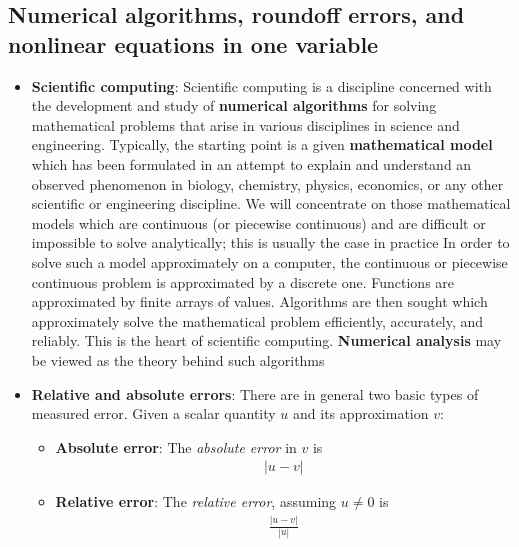 \documentclass{report}
\begin{document}
    \subsection{Numerical algorithms, roundoff errors, and nonlinear equations in one variable}
    \begin{itemize}
        \item \textbf{Scientific computing}: Scientific computing is a discipline concerned with the development and study of \textbf{numerical algorithms} for solving mathematical problems that arise in various disciplines in science and engineering.
            \bigbreak \noindent 
            Typically, the starting point is a given \textbf{mathematical model} which has been formulated in an attempt to explain and understand an observed phenomenon in biology, chemistry, physics, economics, or any other scientific or engineering discipline. We will concentrate on those mathematical models which are continuous (or piecewise continuous) and are difficult or impossible to solve analytically; this is usually the case in practice
            \bigbreak \noindent 
            In order to solve such a model approximately on a computer, the continuous or piecewise continuous problem is approximated by a discrete one. Functions are approximated by finite arrays of values. Algorithms are then sought which approximately solve the mathematical problem efficiently, accurately, and reliably. This is the heart of scientific computing. \textbf{Numerical analysis} may be viewed as the theory behind such algorithms
            \bigbreak \noindent 
        \item \textbf{Relative and absolute errors}: There are in general two basic types of measured error. Given a scalar quantity $u$ and its approximation $v$:
            \begin{itemize}
                \item \textbf{Absolute error}: The \textit{absolute error} in $v$ is 
                    \begin{align*}
                        \left\lvert u - v \right\rvert
                    \end{align*}
                \item \textbf{Relative error}: The \textit{relative error}, assuming $u\ne 0$ is 
                    \begin{align*}
                        \frac{\left\lvert u-v \right\rvert}{\left\lvert u \right\rvert}
                    \end{align*}

\end{itemize}
\end{itemize}
\end{document}
